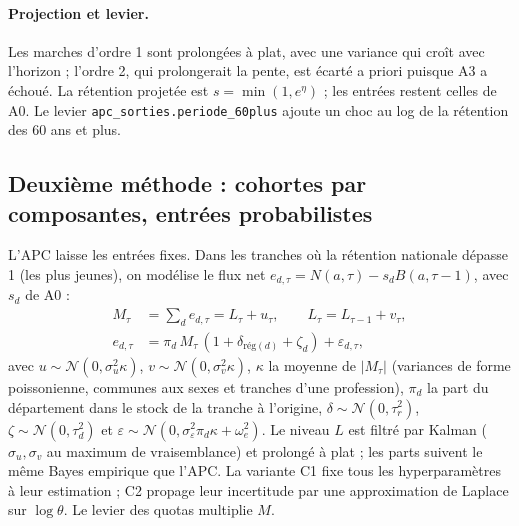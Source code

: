 \documentclass[11pt]{article}
\begin{document}
\paragraph{Projection et levier.} Les marches d'ordre 1 sont prolongées à plat, avec une variance qui
croît avec l'horizon ; l'ordre 2, qui prolongerait la pente, est écarté a priori puisque A3 a échoué.
La rétention projetée est $s = \min(1, e^{\eta})$ ; les entrées restent celles de A0. Le levier
\texttt{apc\_sorties.periode\_60plus} ajoute un choc au log de la rétention des 60 ans et plus.

\subsection{Deuxième méthode : cohortes par composantes, entrées probabilistes}
\label{sec:cohortes}
L'APC laisse les entrées fixes. Dans les tranches où la rétention nationale dépasse 1 (les plus
jeunes), on modélise le flux net $e_{d,\tau} = N(a,\tau) - s_d B(a,\tau-1)$, avec $s_d$ de A0 :
\begin{align}
  M_\tau &= \textstyle\sum_d e_{d,\tau} = L_\tau + u_\tau, \qquad L_\tau = L_{\tau-1} + v_\tau, \\
  e_{d,\tau} &= \pi_d\, M_\tau\,(1 + \delta_{\text{rég}(d)} + \zeta_d) + \varepsilon_{d,\tau},
\end{align}
avec $u \sim \mathcal N(0,\sigma_u^2\kappa)$, $v \sim \mathcal N(0,\sigma_v^2\kappa)$, $\kappa$ la
moyenne de $|M_\tau|$ (variances de forme poissonienne, communes aux sexes et tranches d'une
profession), $\pi_d$ la part du département dans le stock de la tranche à l'origine,
$\delta \sim \mathcal N(0,\tau_r^2)$, $\zeta \sim \mathcal N(0,\tau_d^2)$ et
$\varepsilon \sim \mathcal N(0, \sigma_\varepsilon^2 \pi_d \kappa + \omega_e^2)$. Le niveau $L$ est
filtré par Kalman ($\sigma_u, \sigma_v$ au maximum de vraisemblance) et prolongé à plat ; les parts
suivent le même Bayes empirique que l'APC. La variante C1 fixe tous les hyperparamètres à leur
estimation ; C2 propage leur incertitude par une approximation de Laplace sur $\log\theta$. Le levier
des quotas multiplie $M$.
\end{document}
